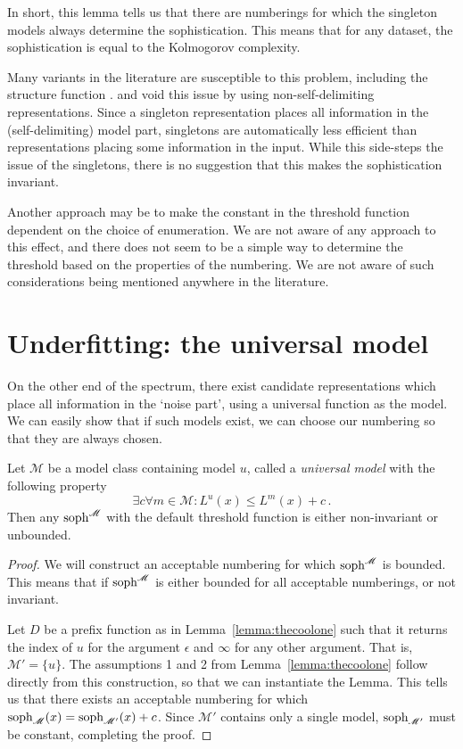 \documentclass{style/llncs}
\newcommand{\M}{\mathscr M}
\newcommand{\tn}[1]{\textnormal{#1}}
\newcommand{\s}{\tn{soph}}
\newcommand{\p}{\,\text{.}}
\begin{document}
In short, this lemma tells us that there are numberings for which the singleton models always determine the sophistication. This means that for any dataset, the sophistication is equal to the Kolmogorov complexity. 

Many variants in the literature are susceptible to this problem, including the structure function \cite{cover1985kolmogorov,gacs2001algorithmic}. \cite{vitanyi2004meaningful} and \cite{adriaans2012facticity} void this issue by using non-self-delimiting representations. Since a singleton representation places all information in the (self-delimiting) model part, singletons are automatically less efficient than representations placing some information in the input. While this side-steps the issue of the singletons, there is no suggestion that this makes the sophistication invariant.

Another approach may be to make the constant in the threshold function dependent on the choice of enumeration. We are not aware of any approach to this effect, and there does not seem to be a simple way to determine the threshold based on the properties of the numbering. We are not aware of such considerations being mentioned anywhere in the literature.

\section{Underfitting: the universal model}

On the other end of the spectrum, there exist candidate representations which place all information in the `noise part', using a universal function as the model. We can easily show that if such models exist, we can choose our numbering so that they are always chosen.

\begin{lemma}[underfitting]
Let $\M$ be a model class containing model $u$, called a \emph{universal model} with the following property
\[
\exists c \forall m \in \M : L^u(x) \leq L^m(x) + c \p
\]  
Then any $\s^\M$ with the default threshold function is either non-invariant or unbounded.
\end{lemma}
\begin{proof}
We will construct an acceptable numbering for which $\s^\M$ is bounded. This means that if $\s^\M$
 is either bounded for all acceptable numberings, or not invariant.
 
Let $D$ be a prefix function as in Lemma~\ref{lemma:thecoolone} such that it returns the index of $u$ for the argument $\epsilon$ and $\infty$ for any other argument. That is, $\M' = \{u\}$. The assumptions 1 and 2 from Lemma~\ref{lemma:thecoolone} follow directly from this construction, so that we can instantiate the Lemma. This tells us that there exists an acceptable numbering for which $\s_\M(x) = \s_{\M'}(x) + c$. Since $\M'$ contains only a single model, $\s_{\M'}$ must be constant, completing the proof.
\end{proof}
\end{document}
